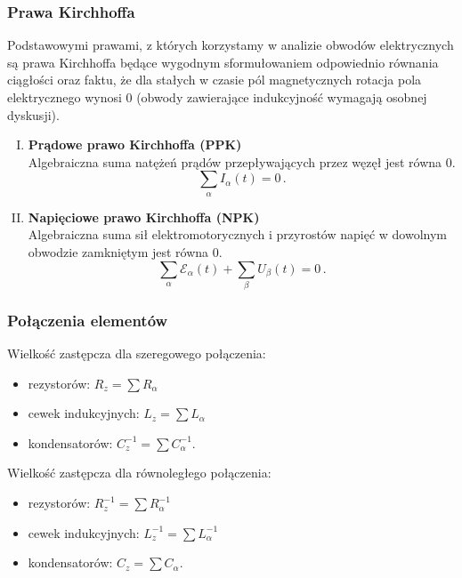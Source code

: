 \documentclass[../main.tex]{subfiles}
\begin{document}
\subsubsection{Prawa Kirchhoffa}
Podstawowymi prawami, z których korzystamy w analizie obwodów elektrycznych są prawa Kirchhoffa będące wygodnym sformułowaniem odpowiednio równania ciągłości oraz faktu, że dla stałych w czasie pól magnetycznych rotacja pola elektrycznego wynosi 0 (obwody zawierające indukcyjność wymagają osobnej dyskusji).
\begin{enumerate}[I.]
    \item \textbf{Prądowe prawo Kirchhoffa (PPK)}\\
    Algebraiczna suma natężeń prądów przepływających przez węzęł jest równa 0.
    \begin{equation*}
        \sum_\alpha I_\alpha (t)=0\,.
    \end{equation*}
    \item \textbf{Napięciowe prawo Kirchhoffa (NPK)}\\
    Algebraiczna suma sił elektromotorycznych i przyrostów napięć w dowolnym obwodzie zamkniętym jest równa 0.
    \begin{equation*}
        \sum_\alpha \mathcal{E}_\alpha(t)+\sum_\beta U_\beta (t)=0\,.
    \end{equation*}
\end{enumerate}
\subsubsection*{Połączenia elementów}
Wielkość zastępcza dla szeregowego połączenia:
\begin{itemize}
    \item rezystorów: \(R_z=\sum R_\alpha\)
    \item cewek indukcyjnych: \(L_z=\sum L_\alpha\)
    \item kondensatorów: \(C_z^{-1}=\sum C_\alpha^{-1}\).
\end{itemize}
Wielkość zastępcza dla równoległego połączenia:
\begin{itemize}
    \item rezystorów: \(R_z^{-1}=\sum R_\alpha^{-1}\)
    \item cewek indukcyjnych: \(L_z^{-1}=\sum L_\alpha^{-1}\)
    \item kondensatorów: \(C_z=\sum C_\alpha\).
\end{itemize}
\end{document}
